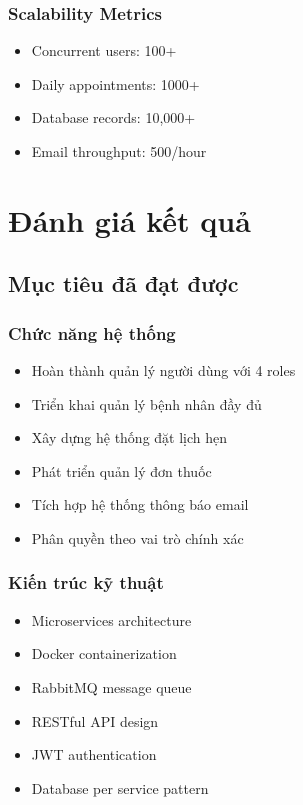 \documentclass[12pt,a4paper]{report}
\begin{document}
\subsection{Scalability Metrics}
\begin{itemize}
    \item Concurrent users: 100+
    \item Daily appointments: 1000+
    \item Database records: 10,000+
    \item Email throughput: 500/hour
\end{itemize}

\chapter{Đánh giá kết quả}

\section{Mục tiêu đã đạt được}

\subsection{Chức năng hệ thống}
\begin{itemize}
    \item Hoàn thành quản lý người dùng với 4 roles
    \item Triển khai quản lý bệnh nhân đầy đủ
    \item Xây dựng hệ thống đặt lịch hẹn
    \item Phát triển quản lý đơn thuốc
    \item Tích hợp hệ thống thông báo email
    \item Phân quyền theo vai trò chính xác
\end{itemize}

\subsection{Kiến trúc kỹ thuật}
\begin{itemize}
    \item Microservices architecture
    \item Docker containerization
    \item RabbitMQ message queue
    \item RESTful API design
    \item JWT authentication
    \item Database per service pattern
\end{itemize}
\end{document}
